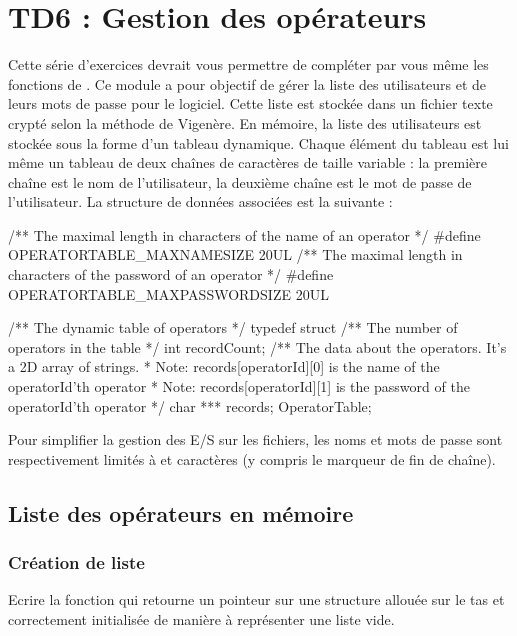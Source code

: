 \chapter{TD6 : Gestion des opérateurs}

Cette série d'exercices devrait vous permettre de compléter par vous même les fonctions de . Ce module a pour objectif de gérer la liste des utilisateurs et de leurs mots de passe pour le logiciel. Cette liste est stockée dans un fichier texte crypté selon la méthode de Vigenère. En mémoire, la liste des utilisateurs est stockée sous la forme d'un tableau dynamique. Chaque élément du tableau est lui même un tableau de deux chaînes de caractères de taille variable : la première chaîne est le nom de l'utilisateur, la deuxième chaîne est le mot de passe de l'utilisateur. La structure de données associées est la suivante :
\begin{csource}
/** The maximal length in characters of the name of an operator */
#define OPERATORTABLE_MAXNAMESIZE 20UL
/** The maximal length in characters of the password of an operator */
#define OPERATORTABLE_MAXPASSWORDSIZE 20UL

/** The dynamic table of operators */
typedef struct {
    /** The number of operators in the table */
    int recordCount;
    /** The data about the operators. It's a 2D array of strings.
     * Note: records[operatorId][0] is the name of the operatorId'th operator
     * Note: records[operatorId][1] is the password of the operatorId'th operator
     */
    char *** records;
} OperatorTable;
\end{csource}
Pour simplifier la gestion des E/S sur les fichiers, les noms et mots de passe sont respectivement limités à \linebreak{} et  caractères (y compris le marqueur de fin de chaîne).

\section{Liste des opérateurs en mémoire}

\subsection{Création de liste}

Ecrire la fonction  qui retourne un pointeur sur une structure \linebreak{} allouée sur le tas et correctement initialisée de manière à représenter une liste vide.

